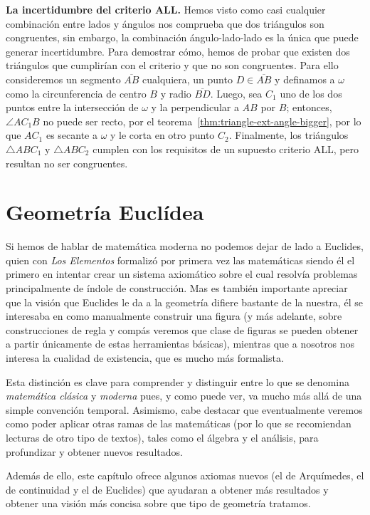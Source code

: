 \documentclass[11pt,a4paper]{book}
\begin{document}
\textbf{La incertidumbre del criterio ALL.} Hemos visto como casi cualquier combinación entre lados y ángulos nos comprueba que dos triángulos son congruentes, sin embargo, la combinación ángulo-lado-lado es la única que puede generar incertidumbre. Para demostrar cómo, hemos de probar que existen dos triángulos que cumplirían con el criterio y que no son congruentes. Para ello consideremos un segmento $\overline{AB}$ cualquiera, un punto $D\in\overline{AB}$ y definamos a $\omega$ como la circunferencia de centro $B$ y radio $\overline{BD}$. Luego, sea $C_1$ uno de los dos puntos entre la intersección de $\omega$ y la perpendicular a $AB$ por $B$; entonces, $\angle AC_1B$ no puede ser recto, por el teorema~\ref{thm:triangle-ext-angle-bigger}, por lo que $AC_1$ es secante a $\omega$ y le corta en otro punto $C_2$. Finalmente, los triángulos $\triangle ABC_1$ y $\triangle ABC_2$ cumplen con los requisitos de un supuesto criterio ALL, pero resultan no ser congruentes.

\chapter{Geometría Euclídea}
Si hemos de hablar de matemática moderna no podemos dejar de lado a Euclides, quien con \textit{Los Elementos} formalizó por primera vez las matemáticas siendo él el primero en intentar crear un sistema axiomático sobre el cual resolvía problemas principalmente de índole de construcción. Mas es también importante apreciar que la visión que Euclides le da a la geometría difiere bastante de la nuestra, él se interesaba en como manualmente construir una figura (y más adelante, sobre construcciones de regla y compás veremos que clase de figuras se pueden obtener a partir únicamente de estas herramientas básicas), mientras que a nosotros nos interesa la cualidad de existencia, que es mucho más formalista.

Esta distinción es clave para comprender y distinguir entre lo que se denomina \textit{matemática clásica} y \textit{moderna} pues, y como puede ver, va mucho más allá de una simple convención temporal. Asimismo, cabe destacar que eventualmente veremos como poder aplicar otras ramas de las matemáticas (por lo que se recomiendan lecturas de otro tipo de textos), tales como el álgebra y el análisis, para profundizar y obtener nuevos resultados.

Además de ello, este capítulo ofrece algunos axiomas nuevos (el de Arquímedes, el de continuidad y el de Euclides) que ayudaran a obtener más resultados y obtener una visión más concisa sobre que tipo de geometría tratamos.
\end{document}
